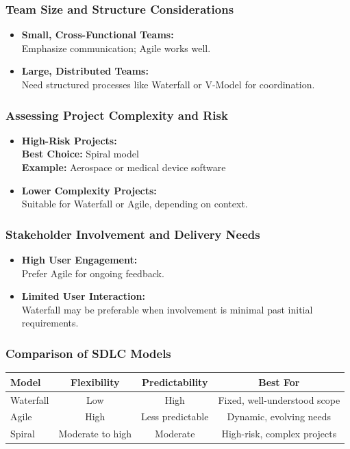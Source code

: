 \documentclass{beamer}
\begin{document}
\begin{frame}[fragile]
  \frametitle{Team Size and Structure Considerations}
  \begin{itemize}
    \item \textbf{Small, Cross-Functional Teams:} \\
    \quad Emphasize communication; Agile works well. \\
    \item \textbf{Large, Distributed Teams:} \\
    \quad Need structured processes like Waterfall or V-Model for coordination.
  \end{itemize}
\end{frame}

\begin{frame}[fragile]
  \frametitle{Assessing Project Complexity and Risk}
  \begin{itemize}
    \item \textbf{High-Risk Projects:} \\
    \quad \textbf{Best Choice:} Spiral model \\
    \quad \textbf{Example:} Aerospace or medical device software \\
    \item \textbf{Lower Complexity Projects:} \\
    \quad Suitable for Waterfall or Agile, depending on context.
  \end{itemize}
\end{frame}

\begin{frame}[fragile]
  \frametitle{Stakeholder Involvement and Delivery Needs}
  \begin{itemize}
    \item \textbf{High User Engagement:} \\
    \quad Prefer Agile for ongoing feedback. \\
    \item \textbf{Limited User Interaction:} \\
    \quad Waterfall may be preferable when involvement is minimal past initial requirements.
  \end{itemize}
\end{frame}

\begin{frame}[fragile]
  \frametitle{Comparison of SDLC Models}
  \begin{tabular}{|l|c|c|c|}
    \hline
    \textbf{Model} & \textbf{Flexibility} & \textbf{Predictability} & \textbf{Best For} \\
    \hline
    Waterfall & Low & High & Fixed, well-understood scope \\
    \hline
    Agile & High & Less predictable & Dynamic, evolving needs \\
    \hline
    Spiral & Moderate to high & Moderate & High-risk, complex projects \\
    \hline
  \end{tabular}
\end{frame}
\end{document}

